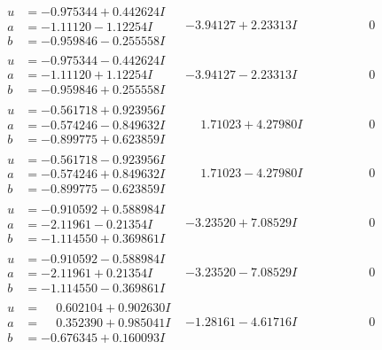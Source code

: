 \documentclass[1p]{elsarticle_modified}
\theoremstyle{definition}
\begin{document}
$$\begin{array}{c|c|c}
\begin{aligned}
u &= -0.975344 + 0.442624 I \\
a &= -1.11120 - 1.12254 I \\
b &= -0.959846 - 0.255558 I\end{aligned}
 & -3.94127 + 2.23313 I & \phantom{-0.000000 } 0 \\ \hline\begin{aligned}
u &= -0.975344 - 0.442624 I \\
a &= -1.11120 + 1.12254 I \\
b &= -0.959846 + 0.255558 I\end{aligned}
 & -3.94127 - 2.23313 I & \phantom{-0.000000 } 0 \\ \hline\begin{aligned}
u &= -0.561718 + 0.923956 I \\
a &= -0.574246 - 0.849632 I \\
b &= -0.899775 + 0.623859 I\end{aligned}
 & \phantom{-}1.71023 + 4.27980 I & \phantom{-0.000000 } 0 \\ \hline\begin{aligned}
u &= -0.561718 - 0.923956 I \\
a &= -0.574246 + 0.849632 I \\
b &= -0.899775 - 0.623859 I\end{aligned}
 & \phantom{-}1.71023 - 4.27980 I & \phantom{-0.000000 } 0 \\ \hline\begin{aligned}
u &= -0.910592 + 0.588984 I \\
a &= -2.11961 - 0.21354 I \\
b &= -1.114550 + 0.369861 I\end{aligned}
 & -3.23520 + 7.08529 I & \phantom{-0.000000 } 0 \\ \hline\begin{aligned}
u &= -0.910592 - 0.588984 I \\
a &= -2.11961 + 0.21354 I \\
b &= -1.114550 - 0.369861 I\end{aligned}
 & -3.23520 - 7.08529 I & \phantom{-0.000000 } 0 \\ \hline\begin{aligned}
u &= \phantom{-}0.602104 + 0.902630 I \\
a &= \phantom{-}0.352390 + 0.985041 I \\
b &= -0.676345 + 0.160093 I\end{aligned}
 & -1.28161 - 4.61716 I & \phantom{-0.000000 } 0 \\ \hline\begin{aligned}

\end{aligned}
\end{array}$$
\end{document}
